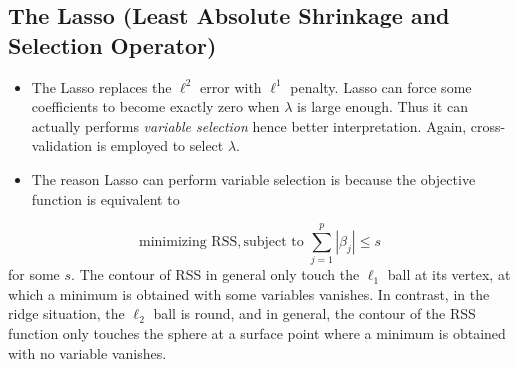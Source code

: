 \documentclass[
  letterpaper,
  DIV=11,
  numbers=noendperiod]{scrreprt}
\begin{document}
\subsection{The Lasso (Least Absolute Shrinkage and Selection
Operator)}\label{the-lasso-least-absolute-shrinkage-and-selection-operator}

\begin{itemize}
\item
  The Lasso replaces the \(\ell^2\) error with \(\ell^1\) penalty. Lasso
  can force some coefficients to become exactly zero when \(\lambda\) is
  large enough. Thus it can actually performs \emph{variable selection}
  hence better interpretation. Again, cross-validation is employed to
  select \(\lambda\).
\item
  The reason Lasso can perform variable selection is because the
  objective function is equivalent to
\end{itemize}

\[\text {minimizing RSS}, \text{subject to } \sum_{j=1}^p |\beta_j| \le s
  \] for some \(s\). The contour of RSS in general only touch the
\(\ell_1\) ball at its vertex, at which a minimum is obtained with some
variables vanishes. In contrast, in the ridge situation, the \(\ell_2\)
ball is round, and in general, the contour of the RSS function only
touches the sphere at a surface point where a minimum is obtained with
no variable vanishes.
\end{document}

